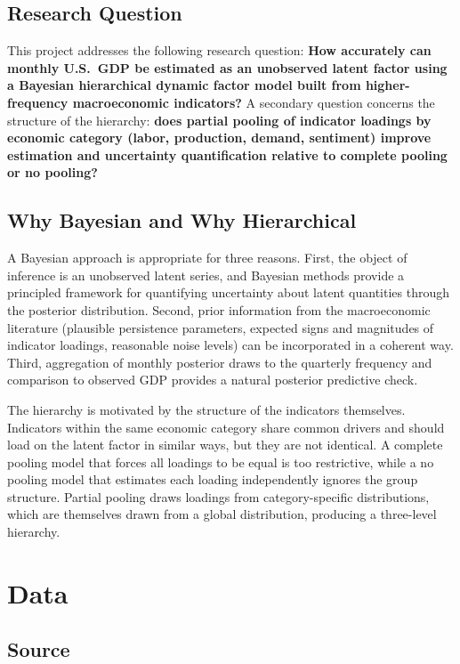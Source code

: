 \documentclass[11pt]{article}
\begin{document}
\subsection{Research Question}

This project addresses the following research question: \textbf{How accurately can monthly U.S.\ GDP be estimated as an unobserved latent factor using a Bayesian hierarchical dynamic factor model built from higher-frequency macroeconomic indicators?} A secondary question concerns the structure of the hierarchy: \textbf{does partial pooling of indicator loadings by economic category (labor, production, demand, sentiment) improve estimation and uncertainty quantification relative to complete pooling or no pooling?}

\subsection{Why Bayesian and Why Hierarchical}

A Bayesian approach is appropriate for three reasons. First, the object of inference is an unobserved latent series, and Bayesian methods provide a principled framework for quantifying uncertainty about latent quantities through the posterior distribution. Second, prior information from the macroeconomic literature (plausible persistence parameters, expected signs and magnitudes of indicator loadings, reasonable noise levels) can be incorporated in a coherent way. Third, aggregation of monthly posterior draws to the quarterly frequency and comparison to observed GDP provides a natural posterior predictive check.

The hierarchy is motivated by the structure of the indicators themselves. Indicators within the same economic category share common drivers and should load on the latent factor in similar ways, but they are not identical. A complete pooling model that forces all loadings to be equal is too restrictive, while a no pooling model that estimates each loading independently ignores the group structure. Partial pooling draws loadings from category-specific distributions, which are themselves drawn from a global distribution, producing a three-level hierarchy.

\section{Data}

\subsection{Source}
\end{document}
